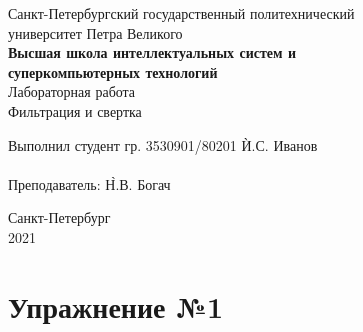 \documentclass[a4paper, 14pt]{extarticle}
\begin{document}
    \begin{center}
        \begin{center}
            \hfill \break
            \normalsize{Санкт-Петербургский государственный политехнический}\\
            \normalsize{университет Петра Великого}\\
            \hfill \break
            \normalsize{\textbf{Высшая школа интеллектуальных систем и}}\\
            \normalsize{\textbf{суперкомпьютерных технологий}}\\
            \hfill \break
            \hfill \break
            \hfill \break
            \normalsize{Лабораторная работа}\\
            \hfill \break
            \normalsize{\LARGE Фильтрация и свертка}\\
        \end{center}
        \hfill \break
        \hfill \break
        \hfill \break
        \hfill \break
        \hfill \break
        \hfill \break
        \hfill \break
        \hfill \break
        \hfill \break
        \hfill \break
        \begin{tabbing}
            Выполнил студент гр. 3530901/80201 \`И.С. Иванов\\
            \\
            Преподаватель: \`Н.В. Богач\\
        \end{tabbing}
        \hfill \break
        \hfill \break
        \hfill \break
        \hfill \break
        \begin{center}
            Санкт-Петербург\\
            2021
        \end{center}
        \thispagestyle{empty}
    \end{center}

    \newpage
    \tableofcontents

    \newpage
    \listoffigures

    \newpage
    \lstlistoflistings

    \newpage


    \section{Упражнение №1}
    \label{sec:1}
\end{document}

